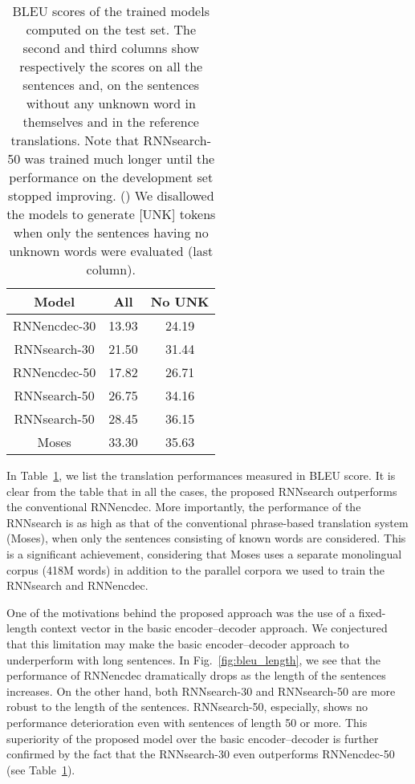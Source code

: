 \begin{table}[t]
    \centering
    \hfill
    \begin{minipage}{0.45\textwidth}
        \begin{tabular}{c|c|c}
        Model & All & No UNK \\
        \hline
        \hline
        RNNencdec-30 & 13.93 & 24.19 \\
        RNNsearch-30 & 21.50 & 31.44 \\
        \hline
        RNNencdec-50 & 17.82 & 26.71 \\
        RNNsearch-50 & 26.75 & 34.16 \\
        \hline
        RNNsearch-50 & 28.45 & 36.15 \\
        \hline
        Moses & 33.30 & 35.63
        \end{tabular}
    \end{minipage}
    \begin{minipage}[t!]{0.53\textwidth}
        \vspace{-2mm}

        \caption{BLEU scores of the trained models computed on the test set.
            The second and third columns show respectively the scores on all the
            sentences and, on the sentences without any unknown word in
            themselves and in the reference translations. Note that
            RNNsearch-50 was trained much longer until the performance
            on the development set stopped improving.  () We disallowed
            the models to generate [UNK] tokens when only the sentences having
            no unknown words were evaluated (last column).  
        }
        \label{tab:bleu}
    \end{minipage}
    \hfill
\end{table}

In Table~\ref{tab:bleu}, we list the translation performances measured in BLEU
score. It is clear from the table that in all the cases, the proposed RNNsearch
outperforms the conventional RNNencdec.  More importantly, the performance of the
RNNsearch is as high as that of the conventional phrase-based translation system
(Moses), when only the sentences consisting of known words are considered. This
is a significant achievement, considering that Moses uses a separate monolingual
corpus (418M words) in addition to the parallel corpora we used to train the
RNNsearch and RNNencdec.

One of the motivations behind the proposed approach was the use of a
fixed-length context vector in the basic encoder--decoder approach. We
conjectured that this limitation may make the basic encoder--decoder approach to
underperform with long sentences. In Fig.~\ref{fig:bleu_length}, we see that the
performance of RNNencdec dramatically drops as the length of the sentences
increases. On the other hand, both RNNsearch-30 and RNNsearch-50 are more robust
to the length of the sentences. RNNsearch-50, especially, shows no performance
deterioration even with sentences of length 50 or more. This superiority of the
proposed model over the basic encoder--decoder is further confirmed by the fact
that the RNNsearch-30 even outperforms RNNencdec-50 (see Table~\ref{tab:bleu}).

